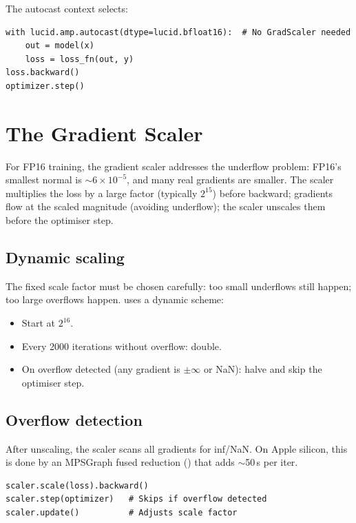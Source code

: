 The autocast context selects:

\begin{lstlisting}[style=lucid,language=LucidPython]
with lucid.amp.autocast(dtype=lucid.bfloat16):  # No GradScaler needed
    out = model(x)
    loss = loss_fn(out, y)
loss.backward()
optimizer.step()
\end{lstlisting}

\section{The Gradient Scaler}
\label{sec:amp_integration:grad_scaler}

For FP16 training, the gradient scaler addresses the underflow
problem: FP16's smallest normal is $\sim$$6 \times 10^{-5}$, and
many real gradients are smaller. The scaler multiplies the loss
by a large factor (typically $2^{15}$) before backward; gradients
flow at the scaled magnitude (avoiding underflow); the scaler
unscales them before the optimiser step.

\subsection{Dynamic scaling}
\label{ssec:amp_integration:dynamic_scaling}

The fixed scale factor must be chosen carefully: too small
underflows still happen; too large overflows happen.
 uses a dynamic scheme:

\begin{itemize}
  \item Start at $2^{16}$.
  \item Every 2000 iterations without overflow: double.
  \item On overflow detected (any gradient is $\pm\infty$ or
    NaN): halve and skip the optimiser step.
\end{itemize}

\subsection{Overflow detection}
\label{ssec:amp_integration:overflow_detection}

After unscaling, the scaler scans all gradients for inf/NaN.
On Apple silicon, this is done by an MPSGraph fused reduction
() that adds $\sim$50\,\textmu s
per iter.

\begin{lstlisting}[style=lucid,language=LucidPython]
scaler.scale(loss).backward()
scaler.step(optimizer)   # Skips if overflow detected
scaler.update()          # Adjusts scale factor
\end{lstlisting}


